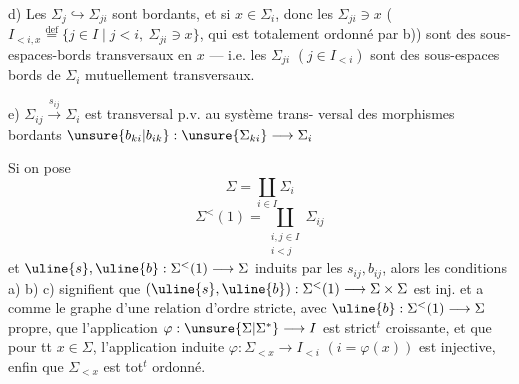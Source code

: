 d)  Les $\Sigma_j\hookrightarrow\Sigma_{ji}$ sont bordants, et si
$x\in\Sigma_i$,  donc les $\Sigma_{ji}\ni x$ (
\deleted{$\unsure{\Sigma}$} $I_{<i,x}\overset{\mathrm{def}}{=}\{j\in I\mid j<i,\ \Sigma_{ji}\ni x\}$,
qui est totalement ordonné par b)) sont
des sous-espaces-bords transversaux en $x$
--- i.e. les $\Sigma_{ji}$ $(j\in I_{<i})$ sont des
sous-espaces bords de $\Sigma_i$ mutuellement
transversaux.

e) $\Sigma_{ij}\xrightarrow{s_{ij}}\Sigma_i$ est transversal p.v. au système trans-
versal des morphismes bordants
$\unsure{b_{ki}|b_{ik}}:\unsure{\Sigma_{ki}}\longrightarrow\Sigma_i$

Si on pose
\[
\Sigma=\coprod_{i\in I}\Sigma_i
\]
\[
\Sigma^{<}(1)=\coprod_{\substack{i,j\in I\\i<j}}\Sigma_{ij}
\]
et $\uline{s},\uline{b}:\Sigma^{<}(1)\longrightarrow\Sigma$ induits par les
$s_{ij},b_{ij}$, alors les conditions a) b) c)
signifient que $(\uline{s},\uline{b}):\Sigma^{<}(1)\longrightarrow\Sigma\times\Sigma$ est
inj. et a comme  le graphe d'une
relation d'ordre stricte, avec $\uline{b}:\Sigma^{<}(1)\longrightarrow\Sigma$
 propre,  que l'application  $\varphi:\unsure{\Sigma|\Sigma^{*}}\longrightarrow I$
est strict${}^t$ croissante, et que pour tt $x\in\Sigma$,
l'application induite $\varphi:\Sigma_{<x}\longrightarrow I_{<i}$ $(i=\varphi(x))$ est
injective, enfin que $\Sigma_{<x}$ est tot${}^t$ ordonné.
